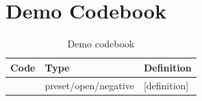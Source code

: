 \section{Demo Codebook}

\begin{table}[htbp]
\centering
\caption{Demo codebook}
\begin{tabularx}{\textwidth}{P{3cm}P{2.4cm}Y}
\toprule
\textbf{Code} & \textbf{Type} & \textbf{Definition} \\
\midrule
[code] & preset/open/negative & [definition] \\
\bottomrule
\end{tabularx}
\end{table}
